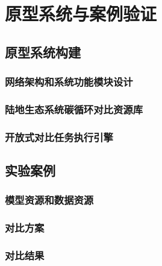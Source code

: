 \chapter{原型系统与案例验证}

\section{原型系统构建}
\subsection{网络架构和系统功能模块设计}
\subsection{陆地生态系统碳循环对比资源库}
\subsection{开放式对比任务执行引擎}

\section{实验案例}
\subsection{模型资源和数据资源}
\subsection{对比方案}
\subsection{对比结果}